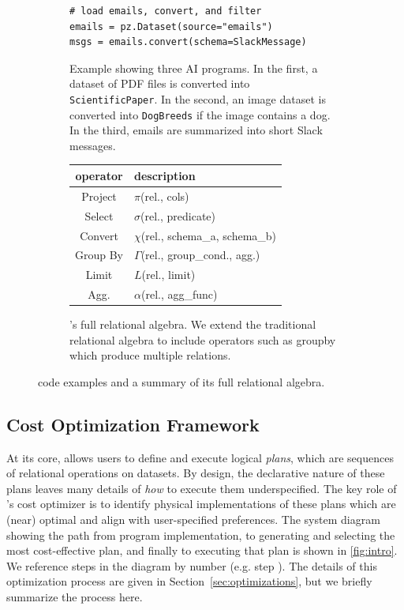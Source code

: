 \begin{figure}[t!]
\begin{subfigure}[t]{0.55\textwidth}
\begin{verbatim}
# load emails, convert, and filter
emails = pz.Dataset(source="emails")
msgs = emails.convert(schema=SlackMessage)
        \end{verbatim}
        \caption{Example showing three AI programs. In the first, a dataset of PDF files is converted into {\tt ScientificPaper}. In the second, an image dataset is converted into {\tt DogBreeds} if the image contains a dog. In the third, emails are summarized into short Slack messages.}
        \label{fig:examples}
    \end{subfigure}
    \hfill
    \begin{subfigure}[t]{0.4\textwidth}
        \vspace{0pt}
        \renewcommand{\arraystretch}{1.3}
        \begin{tabular}{|c|l|}
        \hline
        {\bf operator } & {\bf description } \\
        \hline
        Project & $\pi$(rel., cols) \\
        \hline
        Select & $\sigma$(rel., predicate) \\
        \hline
        Convert & $\chi$(rel., schema\_a, schema\_b) \\
        \hline
        Group By & $\Gamma$(rel., group\_cond., agg.) \\
        \hline
        Limit & $L$(rel., limit) \\
        \hline
        Agg. & $\alpha$(rel., agg\_func) \\
        \hline
        \end{tabular}
        \caption{\system{}'s full relational algebra. We extend the traditional relational algebra to include operators such as groupby which produce multiple relations.}
        \label{fig:algebra}
    \end{subfigure}
    \caption{\system{} code examples and a summary of its full relational algebra.}
\end{figure}


\subsection{Cost Optimization Framework}

\label{sec:planning}

At its core, \system{} allows users to define and execute logical \emph{plans}, which are sequences of relational operations on datasets. By design, the declarative nature of these plans leaves many details of \textit{how} to execute them underspecified. The key role of \system's cost optimizer is to identify physical implementations of these plans which are (near) optimal and align with user-specified preferences. The system diagram showing the path from program implementation, to generating and selecting the most cost-effective plan, and finally to executing that plan is shown in \autoref{fig:intro}. We reference steps in the diagram by number (e.g. step ).  The details of this optimization process are given in Section~\ref{sec:optimizations}, but we briefly summarize the process here.

